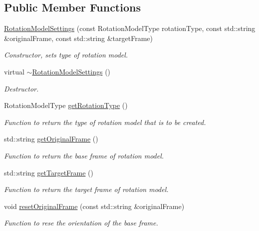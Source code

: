 \subsection*{Public Member Functions}
\begin{DoxyCompactItemize}
\item 
\hyperlink{classtudat_1_1simulation__setup_1_1RotationModelSettings_aebe6e9ad90787c441e4736971b778396}{Rotation\+Model\+Settings} (const Rotation\+Model\+Type rotation\+Type, const std\+::string \&original\+Frame, const std\+::string \&target\+Frame)
\begin{DoxyCompactList}\small\item\em Constructor, sets type of rotation model. \end{DoxyCompactList}\item 
virtual \hyperlink{classtudat_1_1simulation__setup_1_1RotationModelSettings_aae3318a08e2fc5dd26b8b038fa51a451}{$\sim$\+Rotation\+Model\+Settings} ()\hypertarget{classtudat_1_1simulation__setup_1_1RotationModelSettings_aae3318a08e2fc5dd26b8b038fa51a451}{}\label{classtudat_1_1simulation__setup_1_1RotationModelSettings_aae3318a08e2fc5dd26b8b038fa51a451}

\begin{DoxyCompactList}\small\item\em Destructor. \end{DoxyCompactList}\item 
Rotation\+Model\+Type \hyperlink{classtudat_1_1simulation__setup_1_1RotationModelSettings_afbb5f870668604c75eab753968cb6b6d}{get\+Rotation\+Type} ()
\begin{DoxyCompactList}\small\item\em Function to return the type of rotation model that is to be created. \end{DoxyCompactList}\item 
std\+::string \hyperlink{classtudat_1_1simulation__setup_1_1RotationModelSettings_a9ba9508d4c524bcd90f0a09e36b3bdd5}{get\+Original\+Frame} ()
\begin{DoxyCompactList}\small\item\em Function to return the base frame of rotation model. \end{DoxyCompactList}\item 
std\+::string \hyperlink{classtudat_1_1simulation__setup_1_1RotationModelSettings_a4f7f267d90d71182613fedfdc0363e4d}{get\+Target\+Frame} ()
\begin{DoxyCompactList}\small\item\em Function to return the target frame of rotation model. \end{DoxyCompactList}\item 
void \hyperlink{classtudat_1_1simulation__setup_1_1RotationModelSettings_a7a3e915574afe20bb1ca65577a032226}{reset\+Original\+Frame} (const std\+::string \&original\+Frame)
\begin{DoxyCompactList}\small\item\em Function to rese the orientation of the base frame. \end{DoxyCompactList}\end{DoxyCompactItemize}
